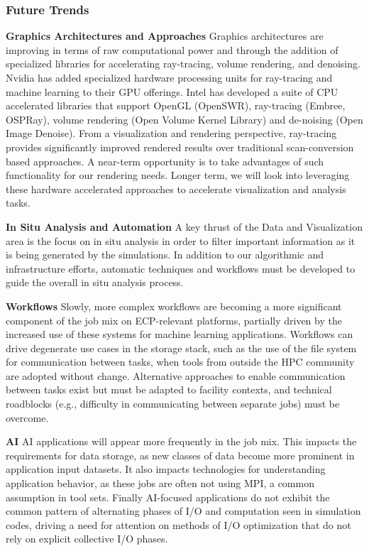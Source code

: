 \subsubsection{Future Trends}

\textbf{Graphics Architectures and Approaches}  Graphics architectures are improving in terms of raw computational power and through the addition of specialized libraries for accelerating ray-tracing, volume rendering, and denoising. Nvidia has added specialized hardware processing units for ray-tracing and machine learning to their GPU offerings.  Intel has developed a suite of CPU accelerated libraries that support OpenGL (OpenSWR), ray-tracing (Embree, OSPRay), volume rendering (Open Volume Kernel Library) and de-noising (Open Image Denoise). From a visualization and rendering perspective, ray-tracing provides significantly improved rendered results over traditional scan-conversion based approaches.  A near-term opportunity is to take advantages of such functionality for our rendering needs. Longer term, we will look into leveraging these hardware accelerated approaches to accelerate visualization and analysis tasks.

\textbf{In Situ Analysis and Automation}  A key thrust of the Data and Visualization area is the focus on in situ analysis in order to filter important information as it is being generated by the simulations. In addition to our algorithmic and infrastructure efforts, automatic techniques and workflows must be developed to guide the overall in situ analysis process.

\textbf{Workflows} Slowly, more complex workflows are becoming a more significant component of the job mix on ECP-relevant platforms, partially driven by the increased use of these systems for machine learning applications. Workflows can drive degenerate use cases in the storage stack, such as the use of the file system for communication between tasks, when tools from outside the HPC community are adopted without change. Alternative approaches to enable communication between tasks exist but must be adapted to facility contexts, and technical roadblocks (e.g., difficulty in communicating between separate jobs) must be overcome.

\textbf{AI} AI applications will appear more frequently in the job mix. This impacts the requirements for data storage, as new classes of data become more prominent in application input datasets. It also impacts technologies for understanding application behavior, as these jobs are often not using MPI, a common assumption in tool sets. Finally AI-focused applications do not exhibit the common pattern of alternating phases of I/O and computation seen in simulation codes, driving a need for attention on methods of I/O optimization that do not rely on explicit collective I/O phases.

